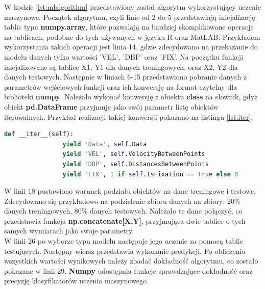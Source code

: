 W kodzie \ref{lst:mlalgorithm} przedstawiony został algorytm wykorzystujący uczenie maszynowe. Początek algorytmu, czyli linie od 2 do 5 przedstawiają inicjalizację tablic typu \textbf{numpy.array}, które pozwalają na bardziej skomplikowane operacje na tablicach, podobne do tych używanych w języku R oraz MatLAB. Przykładem wykorzystania takich operacji jest linia 14, gdzie zdecydowano na przekazanie do modelu danych tylko wartości 'VEL', 'DBP' oraz 'FIX'. Na początku funkcji inicjalizowane są tablice X1, Y1 dla danych treningowych, oraz X2, Y2 dla danych testowych. Następnie w liniach 6-15 przedstawiono pobranie danych z parametrów wejściowych funkcji oraz ich konwersję na format czytelny dla biblioteki \textbf{numpy}. Należało wykonać konwersję z obiektu \textbf{class} na słownik, gdyż obiekt \textbf{pd.DataFrame} przyjmuje jako swój parametr listę obiektów iterowalnych. Przykład realizacji takiej konwersji pokazano na listingu \ref{lst:iter}.
\begin{lstlisting}[language=Python, caption=Iterator, label={lst:iter}]
        def __iter__(self):
                yield 'Data', self.Data
                yield 'VEL', self.VelocityBetweenPoints
                yield 'DBP', self.DistancesBetweenPoints
                yield 'FIX', 1 if self.IsFixation == True else 0
\end{lstlisting}
W linii 18 postawiono warunek podziału obiektów na dane treningowe i testowe. Zdecydowano się przykładowo na podzielenie zbioru danych na zbiory: 20\% danych treningowych, 80\% danych testowych. Należało te dane połączyć, co przedstawia funkcja \textbf{np.concatenate[X,Y]}, przyjmująca dwie tablice o tych samych wymiarach jako swoje parametry.\\
W linii 26 po wyborze typu modelu następuje jego uczenie za pomocą tablic testujących. Następny wiersz przedstawia wykonanie predykcji. Po obliczeniu wszystkich wartości wynikowych należy zbadać dokładność algorytmu, co zostało pokazane w linii 29. \textbf{Numpy} udostępnia funkcje sprawdzające dokładność oraz precyzję klasyfikatorów uczenia maszynowego.
